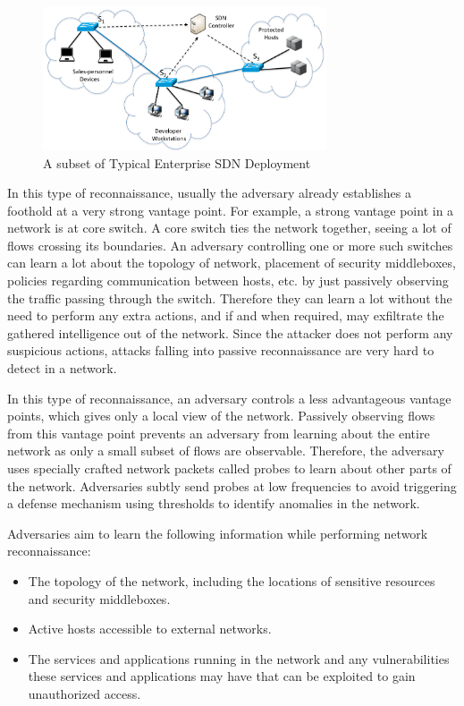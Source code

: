 \begin{figure}[t] 
  \centering 
  \includegraphics[width=3.3in]{img/topo.png} 
  \caption{A subset of Typical Enterprise SDN Deployment} 
  \label{fig:topo} 
\end{figure}

 In this type of
reconnaissance, usually the adversary already establishes a foothold at
a very strong vantage point. For example, a strong vantage point in a 
network is at core switch. A core switch ties the network together,
seeing a lot of flows crossing its boundaries. An adversary controlling
one or more such switches can learn a lot about the topology of network, 
placement of security middleboxes, policies regarding communication 
between hosts, etc. by just passively observing the traffic passing 
through the switch. Therefore they can learn a lot without the need to 
perform any extra actions, and if and when required, may exfiltrate the 
gathered intelligence out of the network. Since the attacker does not 
perform any suspicious actions, attacks falling into passive
reconnaissance are very hard to detect in a network.

 In this type of
reconnaissance, an adversary controls a less advantageous vantage 
points, which gives only a local view of the network. Passively 
observing flows from this vantage point prevents an adversary from
learning about the entire network as only a small subset of flows are
observable. Therefore, the adversary uses specially crafted network
packets called probes to learn about other parts of the network.
Adversaries subtly send probes at low frequencies to avoid triggering a
defense mechanism using thresholds to identify anomalies in the network. 

Adversaries aim to learn the following information while performing
network reconnaissance:

\begin{itemize}
  \item{The topology of the network, including the locations of sensitive
  resources and security middleboxes.}
  \item{Active hosts accessible to external networks.}
  \item{The services and applications running in the network and any 
  vulnerabilities these services and applications may have that
  can be exploited to gain unauthorized access.}
\end{itemize}

